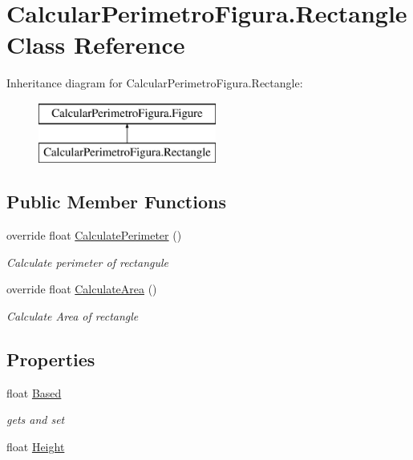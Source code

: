 \hypertarget{class_calcular_perimetro_figura_1_1_rectangle}{}\section{Calcular\+Perimetro\+Figura.\+Rectangle Class Reference}
\label{class_calcular_perimetro_figura_1_1_rectangle}
Inheritance diagram for Calcular\+Perimetro\+Figura.\+Rectangle\+:\begin{figure}[H]
\begin{center}
\leavevmode
\includegraphics[height=2.000000cm]{class_calcular_perimetro_figura_1_1_rectangle}
\end{center}
\end{figure}
\subsection*{Public Member Functions}
\begin{DoxyCompactItemize}
\item 
override float \hyperlink{class_calcular_perimetro_figura_1_1_rectangle_a1a8ce80325c8da9dfc19c3fa69e922d0}{Calculate\+Perimeter} ()
\begin{DoxyCompactList}\small\item\em Calculate perimeter of rectangule \end{DoxyCompactList}\item 
override float \hyperlink{class_calcular_perimetro_figura_1_1_rectangle_aa00df8355d0da9d6656fbb799d9b60bd}{Calculate\+Area} ()
\begin{DoxyCompactList}\small\item\em Calculate Area of rectangle \end{DoxyCompactList}\end{DoxyCompactItemize}
\subsection*{Properties}
\begin{DoxyCompactItemize}
\item 
float \hyperlink{class_calcular_perimetro_figura_1_1_rectangle_a7818a1ccf4e1f12c683b7ea6f8834567}{Based}
\begin{DoxyCompactList}\small\item\em gets and set \end{DoxyCompactList}\item 
float \hyperlink{class_calcular_perimetro_figura_1_1_rectangle_a16c89c3d3d96d2a3902cedda9533ff83}{Height}
\end{DoxyCompactItemize}


